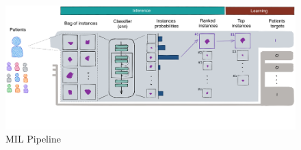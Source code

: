 \documentclass[final]{cvpr}
\begin{document}
	\begin{figure}[h!]
		\begin{center}
			\includegraphics[width=0.99\linewidth, trim=0cm 5cm 0cm 0cm, clip]{fig/mil_pipeline.pdf}
		\end{center}
		\caption{MIL Pipeline}
		\label{fig:mil_pipeline}
	\end{figure}
\end{document}
